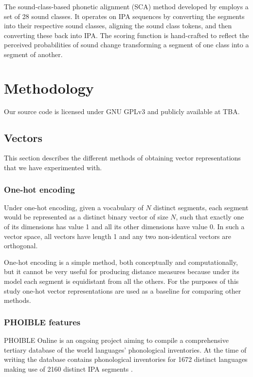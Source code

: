 \documentclass[a4paper]{report}
\begin{document}
The sound-class-based phonetic alignment (SCA) method developed by \citet{2012_List} employs a set of 28 sound classes.
It operates on IPA sequences by converting the segments into their respective sound classes, aligning the sound class tokens, and then converting these back into IPA.
The scoring function is hand-crafted to reflect the perceived probabilities of sound change transforming a segment of one class into a segment of another.


\chapter{Methodology}

Our source code is licensed under GNU GPLv3 and publicly available at TBA.


\section{Vectors}

This section describes the different methods of obtaining vector representations that we have experimented with.

\subsection{One-hot encoding}

Under one-hot encoding, given a vocabulary of $N$ distinct segments, each segment would be represented as a distinct binary vector of size $N$,
such that exactly one of its dimensions has value 1 and all its other dimensions have value 0.
In such a vector space, all vectors have length 1 and any two non-identical vectors are orthogonal.

One-hot encoding is a simple method, both conceptually and computationally, but it cannot be very useful for producing distance measures
because under its model each segment is equidistant from all the others.
For the purposes of this study one-hot vector representations are used as a baseline for comparing other methods.


\subsection{PHOIBLE features}

PHOIBLE Online is an ongoing project aiming to compile a comprehensive tertiary database of the world languages' phonological inventories.
At the time of writing the database contains phonological inventories for 1672 distinct languages making use of 2160 distinct IPA segments \citep{2014_Moran_al}.
\end{document}
